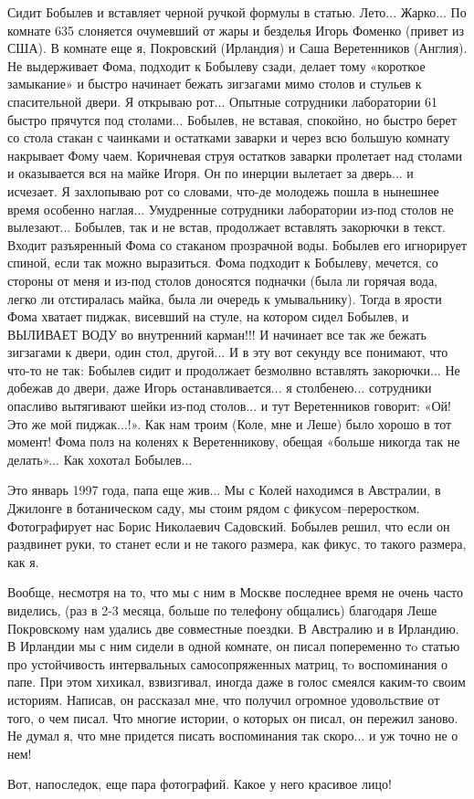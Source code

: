 Сидит Бобылев и вставляет черной ручкой формулы в статью. Лето... Жарко...
По комнате 635 слоняется очумевший от жары и безделья Игорь Фоменко (привет из США).
В комнате еще я, Покровский (Ирландия) и Саша Веретенников (Англия). Не выдерживает Фома, подходит к Бобылеву сзади, делает тому «короткое замыкание» и быстро начинает бежать зигзагами мимо столов и стульев к спасительной двери. Я открываю рот... Опытные сотрудники лаборатории 61 быстро прячутся под столами... Бобылев, не вставая, спокойно, но быстро берет со стола стакан с чаинками и остатками заварки и через всю большую комнату накрывает Фому чаем. Коричневая струя остатков заварки пролетает над столами и оказывается вся на майке Игоря. Он по инерции вылетает за дверь... и исчезает. Я захлопываю рот со словами, что-де молодежь пошла в нынешнее время особенно наглая... Умудренные сотрудники лаборатории из-под столов не вылезают... Бобылев, так и не встав, продолжает вставлять закорючки в текст. Входит разъяренный Фома со стаканом прозрачной воды. Бобылев его игнорирует спиной, если так можно выразиться. Фома подходит к Бобылеву, мечется, со стороны от меня и из-под столов доносятся подначки (была ли горячая вода, легко ли отстиралась майка, была ли очередь к умывальнику). Тогда в ярости Фома хватает пиджак, висевший на стуле, на котором сидел Бобылев, и ВЫЛИВАЕТ ВОДУ во внутренний карман!!! И начинает все так же бежать зигзагами к двери, один стол, другой... И в эту вот секунду все понимают, что что-то не так: Бобылев сидит и продолжает безмолвно вставлять закорючки... Не добежав до двери, даже Игорь останавливается... я столбенею... сотрудники опасливо вытягивают шейки из-под столов... и тут Веретенников говорит: «Ой! Это же мой пиджак...!». Как нам троим (Коле, мне и Леше) было хорошо в тот момент! Фома полз на коленях к Веретенникову, обещая «больше никогда так не делать»... Как хохотал Бобылев...

Это январь 1997 года, папа еще жив... Мы с Колей находимся в Австралии, в Джилонге в ботаническом саду, мы стоим рядом с фикусом–переростком. Фотографирует нас Борис Николаевич Садовский. Бобылев решил, что если он раздвинет руки, то станет если и не такого размера, как фикус, то такого размера, как я.

Вообще, несмотря на то, что мы с ним в Москве последнее время не очень часто виделись, (раз в 2-3 месяца, больше по телефону общались) благодаря Леше Покровскому нам удались две совместные поездки. В Австралию и в Ирландию. В Ирландии мы с ним сидели в одной комнате, он писал попеременно тo статью про устойчивость интервальных самосопряженных матриц, тo воспоминания о папе. При этом хихикал, взвизгивал, иногда даже в голос смеялся каким-то своим историям. Написав, он рассказал мне, что получил огромное удовольствие от того, о чем писал. Что многие истории, о которых он писал, он пережил заново. Не думал я, что мне придется писать воспоминания так скоро... и уж точно не о нем!

Вот, напоследок, еще пара фотографий. Какое у него красивое лицо!
